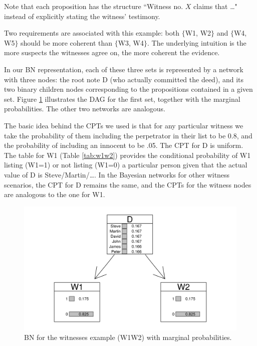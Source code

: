 \documentclass[10pt,]{scrartcl}
\begin{document}
\noindent Note that  each proposition has the structure ``Witness no.
\(X\) claims that \dots" instead of explicitly stating the witness'
testimony.

Two requirements are associated with this example: both
\(\{\)\textsf{W1, W2}\(\}\) and \(\{\)\textsf{W4, W5}\(\}\) should be
more coherent than \(\{\)\textsf{W3, W4}\(\}\).  The underlying intuition is the more suspects the witnesses agree on, the more coherent the evidence. 


In our BN representation, each of these three sets is represented by a network with three nodes: the root note \textsf{D} (who actually committed the deed), and its two binary children nodes corresponding to the propositions contained in a given set. Figure \ref{fig:witnessw1w2} illustrates the DAG for the first set, together with the marginal probabilities. The other two networks are analogous.


The basic idea behind
the CPTs we used is that for any particular witness we take the
probability of them including the perpetrator in their list to be 0.8,
and the probability of including an innocent to be .05.  
The CPT for \textsf{D} is uniform. The table for \textsf{W1}  (Table \ref{tab:w1w2}) provides
the conditional probability of \textsf{W1} listing (\textsf{W1}=1) or
not listing (\textsf{W1}=0) a particular person given that the actual
value of \textsf{D} is Steve/Martin/\dots.  In the
Bayesian networks for other witness scenarios,  the CPT for \textsf{D} remains the same, and the CPTs for the witness nodes are analogous to the one for \textsf{W1}. 






\begin{figure}[h]
\centering
\includegraphics[width =14cm]{../images/w1w2BNv2.png}
\caption{BN for the witnesses example (W1W2) with marginal probabilities.}
\label{fig:witnessw1w2}
\end{figure}
\end{document}
